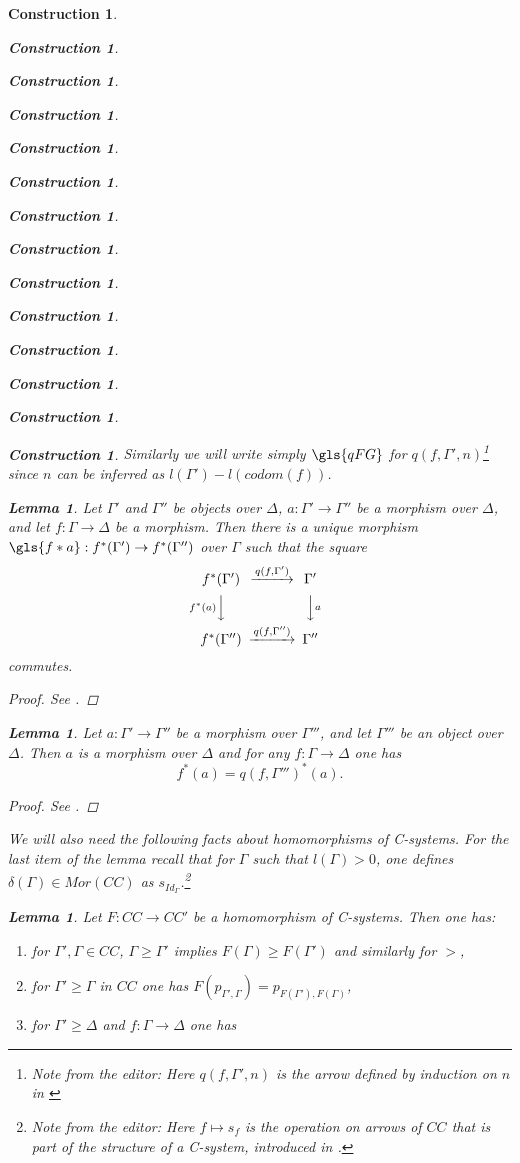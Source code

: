 \documentclass[onecolumn,12pt]{amsart}
\newtheorem{lemma}[proposition]{Lemma}
\numberwithin{proposition}{subsection}
\newtheorem{construction}[proposition]{Construction}
\newcommand{\sr}{\rightarrow}
\newcommand{\editorfootnote}[1]{\footnote{Note from the editor: #1}}
\begin{document}
\begin{construction}
\begin{construction}
\begin{construction}
\begin{construction}
\begin{construction}
\begin{construction}
\begin{construction}
\begin{construction}
\begin{construction}
\begin{construction}
\begin{construction}
\begin{construction}
\begin{construction}
\begin{construction}
Similarly we will write simply $\gls{qFG}$ for $q(f,\Gamma',n)$\editorfootnote{Here $q(f,\Gamma',n)$
 is the arrow defined by induction on $n$ in \cite[section 3]{Csubsystems}} since $n$ can be inferred as $l(\Gamma')-l(codom(f))$. 
%
\begin{lemma}
\label{2015.08.23.l1a} 
Let $\Gamma'$ and $\Gamma''$ be objects over $\Delta$,
$a:\Gamma'\sr \Gamma''$ be a morphism over $\Delta$, and let $f:\Gamma\sr\Delta$ be a
morphism. Then there is a unique morphism $\gls{f*a}:f^*(\Gamma')\sr
f^*(\Gamma'')$ over $\Gamma$ such that the square
%
$$
\begin{CD}
f^*(\Gamma') @>q(f,\Gamma')>> \Gamma'\\
@Vf^*(a)VV @VVaV\\
f^*(\Gamma'') @>q(f,\Gamma'')>> \Gamma''
\end{CD}
$$
%
commutes.
\end{lemma}
%
\begin{proof}
See \cite[Lemma 2.13]{fromunivwithPiI}.
\end{proof}
%
\begin{lemma}
\label{2015.08.29.l2} 
Let $a:\Gamma'\sr\Gamma''$ be a morphism over
$\Gamma'''$, and let $\Gamma'''$ be an object over $\Delta$. Then $a$ is a morphism
over $\Delta$ and for any $f:\Gamma\sr \Delta$ one has
%
\begin{equation}\label{2015.08.29.eq2}
f^*(a)=q(f,\Gamma''')^*(a).
\end{equation}%
%
\end{lemma}
%
\begin{proof}
See \cite[Lemma 2.15]{fromunivwithPiI}.
\end{proof}
%
We will also need the following facts about homomorphisms of C-systems. For the
last item of the lemma recall that for $\Gamma$ such that $l(\Gamma)>0$, one
defines $\delta(\Gamma)\in Mor(CC)$ as $s_{Id_{\Gamma}}$.\editorfootnote{Here $f \mapsto s_f$
  is the operation on arrows of $CC$ that is part of the structure of a C-system, introduced
  in \cite[Definition 2.3]{Csubsystems}.}
%
\begin{lemma}
\label{2015.09.03.l2}
Let $F:CC\sr CC'$ be a homomorphism of C-systems. Then one has:
%
\begin{enumerate}
\item for $\Gamma',\Gamma\in CC$, $\Gamma\ge \Gamma'$ implies $F(\Gamma)\ge F(\Gamma')$ and similarly for $>$,
\item for $\Gamma'\ge \Gamma$ in $CC$ one has $F(p_{\Gamma',\Gamma})=p_{F(\Gamma'),F(\Gamma)}$,
\item for $\Gamma'\ge \Delta$ and $f:\Gamma\sr \Delta$ one has

\end{enumerate}
\end{lemma}
\end{construction}
\end{construction}
\end{construction}
\end{construction}
\end{construction}
\end{construction}
\end{construction}
\end{construction}
\end{construction}
\end{construction}
\end{construction}
\end{construction}
\end{construction}
\end{construction}
\end{document}
